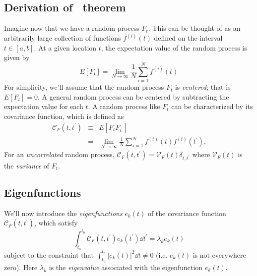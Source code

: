 \subsection{Derivation of \KL\ theorem}
Imagine now that we have a random process $F_t$.  This can be thought of as
an arbitrarily large collection of functions $f^{(i)}(t)$ defined
on the interval
$t \in [a, b]$.  At a given location $t$, the expectation value of the
random process is given by
\begin{equation}
  E[F_t] = \lim_{N \to \infty} \frac{1}{N} \sum_{i=1}^N f^{(i)}(t)
\end{equation}
For simplicity, we'll assume that the random process $F_t$ is {\it
centered}; that is $E[F_t] = 0$.  A general random process can be
centered by subtracting the expectation value for each $t$.
A random process like $F_t$ can be characterized
by its covariance function, which is defined as
\begin{eqnarray}
  \label{eq:corrfunc_def}
  \mathcal{C}_F(t, t^\prime) &\equiv& E[F_t F_{t^\prime}]
  \nonumber\\
  &=& \lim_{N\to\infty}\frac{1}{N} \sum_{i=1}^N
  f^{(i)}(t)f^{(i)}(t^\prime).
\end{eqnarray}
For an {\it uncorrelated} random process,
$\mathcal{C}_F(t, t^\prime) = \mathcal{V}_F(t) \delta_{t, t^\prime}$
where $\mathcal{V}_F(t) $ is the {\it variance} of $F_t$.

\subsection{Eigenfunctions}
We'll now introduce the {\it eigenfunctions} $e_k(t)$
of the covariance function $\mathcal{C}_F(t, t^\prime)$, which satisfy
\begin{equation}
  \label{eq:eigfunc_def}
  \int_{t_a}^{t_b} \mathcal{C}_F(t, t^\prime) e_k(t^\prime)\dd t^\prime
  = \lambda_k e_k(t)
\end{equation}
subject to the constraint that $\int_{t_a}^{t_b}|e_k(t)|^2\dd t \ne 0$
(i.e. $e_k(t)$ is not everywhere zero).
Here $\lambda_k$ is the {\it eigenvalue} associated with the
eigenfunction $e_k(t)$.

